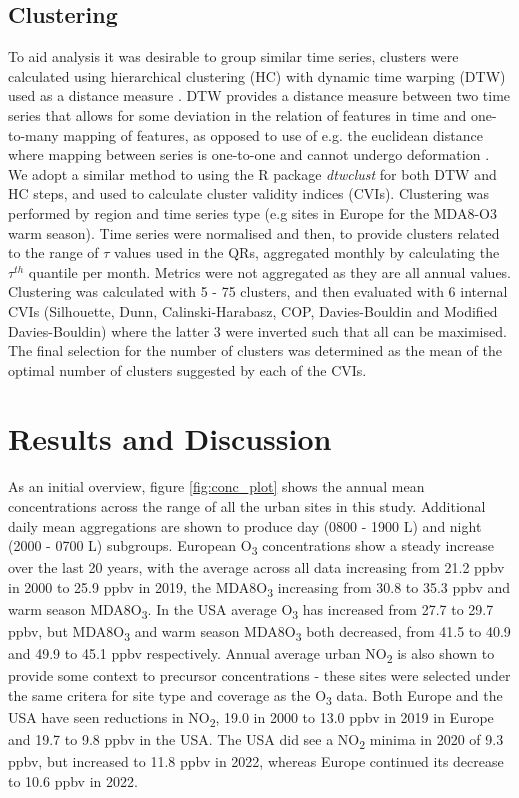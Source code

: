 \documentclass[journal abbreviation, manuscript]{copernicus}
\begin{document}
\subsection{Clustering} \label{sect:method_clustering}
To aid analysis it was desirable to group similar time series, clusters were calculated using hierarchical clustering (HC) with dynamic time warping (DTW) used as a distance measure \citep{AGHABOZORGI201516}. DTW provides a distance measure between two time series that allows for some deviation in the relation of features in time and one-to-many mapping of features, as opposed to use of e.g. the euclidean distance where mapping between series is one-to-one and cannot undergo deformation \citep{Berndt_dtw, Abdullah_Keogh_dtw}. We adopt a similar method to \cite{REED2025110686} using the R package \emph{dtwclust} \citep{dtwclust} for both DTW and HC steps, and used to calculate cluster validity indices (CVIs). Clustering was performed by region and time series type (e.g sites in Europe for the MDA8-O3 warm season). Time series were normalised and then, to provide clusters related to the range of $\tau$ values used in the QRs, aggregated monthly by calculating the $\tau^{th}$ quantile per month. Metrics were not aggregated as they are all annual values. Clustering was calculated with 5 - 75 clusters, and then evaluated with 6 internal CVIs (Silhouette, Dunn, Calinski-Harabasz, COP, Davies-Bouldin and Modified Davies-Bouldin) where the latter 3 were inverted such that all can be maximised. The final selection for the number of clusters was determined as the mean of the optimal number of clusters suggested by each of the CVIs. 

\clearpage
\section{Results and Discussion}

As an initial overview, figure \ref{fig:conc_plot} shows the annual mean concentrations across the range of all the urban sites in this study. Additional daily mean aggregations are shown to produce day (0800 - 1900 L) and night (2000 - 0700 L) subgroups. European O\textsubscript{3} concentrations show a steady increase over the last 20 years, with the average across all data increasing from 21.2 ppbv in 2000 to 25.9 ppbv in 2019, the MDA8O\textsubscript{3} increasing from 30.8 to 35.3 ppbv and warm season MDA8O\textsubscript{3}. In the USA average O\textsubscript{3} has increased from 27.7 to 29.7 ppbv, but MDA8O\textsubscript{3} and warm season MDA8O\textsubscript{3} both decreased, from 41.5 to 40.9 and 49.9 to 45.1 ppbv respectively. Annual average urban NO\textsubscript{2} is also shown to provide some context to precursor concentrations - these sites were selected under the same critera for site type and coverage as the O\textsubscript{3} data. Both Europe and the USA have seen reductions in NO\textsubscript{2}, 19.0 in 2000 to 13.0 ppbv in 2019 in Europe and 19.7 to 9.8 ppbv in the USA. The USA did see a NO\textsubscript{2} minima in 2020 of 9.3 ppbv, but increased to 11.8 ppbv in 2022, whereas Europe continued its decrease to 10.6 ppbv in 2022. 
\end{document}
